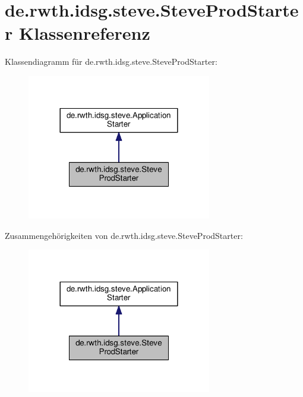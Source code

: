 \hypertarget{classde_1_1rwth_1_1idsg_1_1steve_1_1_steve_prod_starter}{\section{de.\-rwth.\-idsg.\-steve.\-Steve\-Prod\-Starter Klassenreferenz}
\label{classde_1_1rwth_1_1idsg_1_1steve_1_1_steve_prod_starter}
}


Klassendiagramm für de.\-rwth.\-idsg.\-steve.\-Steve\-Prod\-Starter\-:\nopagebreak
\begin{figure}[H]
\begin{center}
\leavevmode
\includegraphics[width=228pt]{classde_1_1rwth_1_1idsg_1_1steve_1_1_steve_prod_starter__inherit__graph}
\end{center}
\end{figure}


Zusammengehörigkeiten von de.\-rwth.\-idsg.\-steve.\-Steve\-Prod\-Starter\-:\nopagebreak
\begin{figure}[H]
\begin{center}
\leavevmode
\includegraphics[width=228pt]{classde_1_1rwth_1_1idsg_1_1steve_1_1_steve_prod_starter__coll__graph}
\end{center}
\end{figure}
